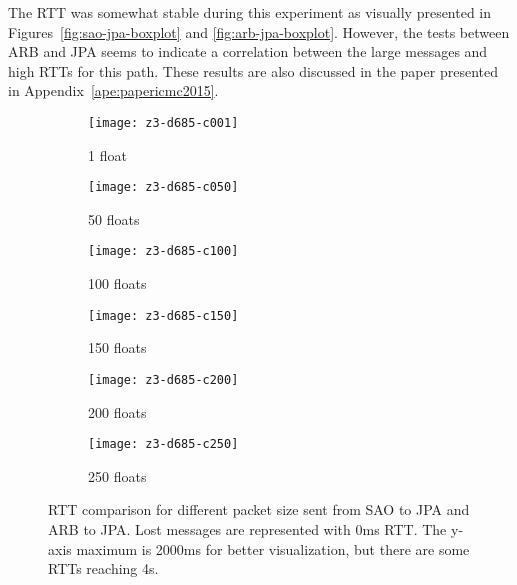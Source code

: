 The RTT was somewhat stable during this experiment as visually presented in Figures~\ref{fig:sao-jpa-boxplot} and \ref{fig:arb-jpa-boxplot}.
However, the tests between ARB and JPA seems to indicate a correlation between the large messages and high RTTs for this path.
These results are also discussed in the paper presented in Appendix~\ref{ape:papericmc2015}.

\begin{figure*}[!ht]
	\centering
	\begin{subfigure}{.45\textwidth}
		\texttt{[image: z3-d685-c001]}
		\caption{1 float}
		\label{fig:z3-d685-c001}
	\end{subfigure}
	\begin{subfigure}{.45\textwidth}
		\texttt{[image: z3-d685-c050]}
		\caption{50 floats}
		\label{fig:z3-d685-c050}
	\end{subfigure}
	\par\bigskip
	\begin{subfigure}{.45\textwidth}
		\texttt{[image: z3-d685-c100]}
		\caption{100 floats}
		\label{fig:z3-d685-c100}
	\end{subfigure}
	\begin{subfigure}{.45\textwidth}
		\texttt{[image: z3-d685-c150]}
		\caption{150 floats}
		\label{fig:z3-d685-4-c150}
	\end{subfigure}
	\bigskip
	\begin{subfigure}{.45\textwidth}
		\texttt{[image: z3-d685-c200]}
		\caption{200 floats}
		\label{fig:z3-d685-c200}
	\end{subfigure}
	\begin{subfigure}{.45\textwidth}
		\texttt{[image: z3-d685-c250]}
		\caption{250 floats}
		\label{fig:z3-d685-c250}
	\end{subfigure} 
	
	\caption{RTT comparison for different packet size sent from SAO to JPA and ARB to JPA. Lost messages are represented with 0ms RTT. The y-axis maximum is 2000ms for better visualization, but there are some RTTs reaching 4s.}
	\label{fig:z3-d685-evaluation}
\end{figure*}

